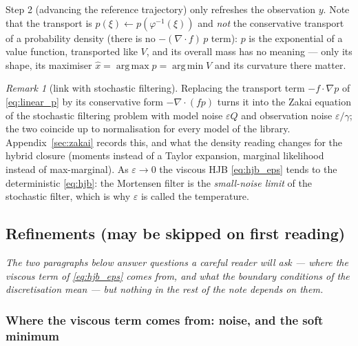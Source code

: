 \documentclass[11pt,a4paper]{article}
\newcommand{\argmin}{\operatorname{arg\,min}}
\newcommand{\argmax}{\operatorname{arg\,max}}
\newcommand{\xh}{\hat{x}}
\newcommand{\eps}{\varepsilon}
\newcommand{\grad}{\nabla}
\theoremstyle{plain}
\theoremstyle{definition}
\theoremstyle{remark}
\newtheorem{remark}{Remark}
\begin{document}
Step 2 (advancing the reference trajectory) only refreshes the observation $y$. Note that the transport is $p(\xi)\leftarrow p(\varphi^{-1}(\xi))$ and \emph{not} the conservative transport of a probability density (there is no $-(\grad\!\cdot\! f)\,p$ term): $p$ is the exponential of a value function, transported like $V$, and its overall mass has no meaning --- only its shape, its maximiser $\xh=\argmax p=\argmin V$ and its curvature there matter.

\begin{remark}[link with stochastic filtering]
Replacing the transport term $-f\cdot\grad p$ of \eqref{eq:linear_p} by its conservative form $-\grad\cdot(fp)$ turns it into the Zakai equation of the stochastic filtering problem with model noise $\eps Q$ and observation noise $\eps/\gamma$; the two coincide up to normalisation for every model of the library. Appendix~\ref{sec:zakai} records this, and what the density reading changes for the hybrid closure (moments instead of a Taylor expansion, marginal likelihood instead of max-marginal). As $\eps\to0$ the viscous HJB \eqref{eq:hjb_eps} tends to the deterministic \eqref{eq:hjb}: the Mortensen filter is the \emph{small-noise limit} of the stochastic filter, which is why $\eps$ is called the temperature.
\end{remark}

\subsection{Refinements (may be skipped on first reading)}
\label{sec:refinements}

\emph{The two paragraphs below answer questions a careful reader will ask --- where the viscous term of \eqref{eq:hjb_eps} comes from, and what the boundary conditions of the discretisation mean --- but nothing in the rest of the note depends on them.}

\subsubsection{Where the viscous term comes from: noise, and the soft minimum}
\label{sec:softmin}
\end{document}
